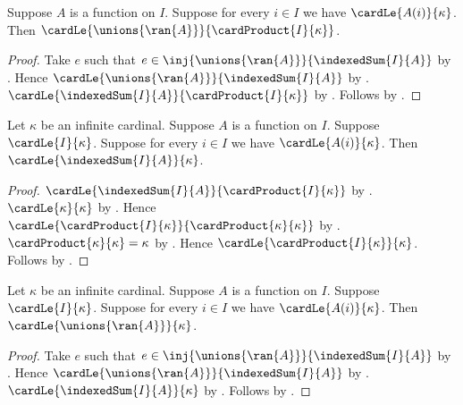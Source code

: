 \begin{corollary}\label{indexed_union_cardinal_product_bound}
    Suppose $A$ is a function on $I$.
    Suppose for every $i\in I$ we have $\cardLe{A(i)}{\kappa}$.
    Then $\cardLe{\unions{\ran{A}}}{\cardProduct{I}{\kappa}}$.
\end{corollary}
\begin{proof}
    Take $e$ such that
        $e\in\inj{\unions{\ran{A}}}{\indexedSum{I}{A}}$
        by .
    Hence $\cardLe{\unions{\ran{A}}}{\indexedSum{I}{A}}$
        by .
    $\cardLe{\indexedSum{I}{A}}{\cardProduct{I}{\kappa}}$
        by .
    Follows by .
\end{proof}

\begin{corollary}\label{indexed_sum_infinite_cardinal_bound}
    Let $\kappa$ be an infinite cardinal.
    Suppose $A$ is a function on $I$.
    Suppose $\cardLe{I}{\kappa}$.
    Suppose for every $i\in I$ we have $\cardLe{A(i)}{\kappa}$.
    Then $\cardLe{\indexedSum{I}{A}}{\kappa}$.
\end{corollary}
\begin{proof}
    $\cardLe{\indexedSum{I}{A}}{\cardProduct{I}{\kappa}}$
        by .
    $\cardLe{\kappa}{\kappa}$
        by .
    Hence $\cardLe{\cardProduct{I}{\kappa}}
        {\cardProduct{\kappa}{\kappa}}$
        by .
    $\cardProduct{\kappa}{\kappa}=\kappa$
        by .
    Hence $\cardLe{\cardProduct{I}{\kappa}}{\kappa}$.
    Follows by .
\end{proof}

\begin{corollary}\label{indexed_union_infinite_cardinal_bound}
    Let $\kappa$ be an infinite cardinal.
    Suppose $A$ is a function on $I$.
    Suppose $\cardLe{I}{\kappa}$.
    Suppose for every $i\in I$ we have $\cardLe{A(i)}{\kappa}$.
    Then $\cardLe{\unions{\ran{A}}}{\kappa}$.
\end{corollary}
\begin{proof}
    Take $e$ such that
        $e\in\inj{\unions{\ran{A}}}{\indexedSum{I}{A}}$
        by .
    Hence $\cardLe{\unions{\ran{A}}}{\indexedSum{I}{A}}$
        by .
    $\cardLe{\indexedSum{I}{A}}{\kappa}$
        by .
    Follows by .
\end{proof}

